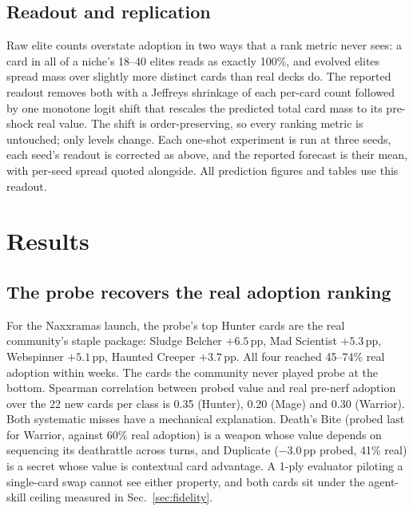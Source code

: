 \documentclass[conference]{IEEEtran}
\newcommand{\pp}{\,\text{pp}}
\begin{document}
\subsection{Readout and replication}
\label{sec:readout}
Raw elite counts overstate adoption in two ways that a rank metric
never sees: a card in all of a niche's 18--40 elites reads as
exactly 100\%, and evolved elites spread mass over slightly more
distinct cards than real decks do. The reported readout removes
both with a Jeffreys shrinkage of each per-card count followed by
one monotone logit shift that rescales the predicted total card
mass to its pre-shock real value. The shift is order-preserving, so
every ranking metric is untouched; only levels change. Each
one-shot experiment is run at three seeds, each seed's readout is
corrected as above, and the reported forecast is their mean, with
per-seed spread quoted alongside. All prediction figures and tables
use this readout.

\section{Results}
\label{sec:results}

\subsection{The probe recovers the real adoption ranking}
For the Naxxramas launch, the probe's top Hunter cards are the real
community's staple package: Sludge Belcher $+6.5\pp$, Mad Scientist
$+5.3\pp$, Webspinner $+5.1\pp$, Haunted Creeper $+3.7\pp$. All four
reached 45--74\% real adoption within weeks. The cards the community
never played probe at the bottom. Spearman correlation between
probed value and real pre-nerf adoption over the 22 new cards per
class is 0.35 (Hunter), 0.20 (Mage) and 0.30 (Warrior). Both
systematic misses have a mechanical explanation. Death's Bite
(probed last for Warrior, against 60\% real adoption) is a weapon
whose value depends on sequencing its deathrattle across turns, and
Duplicate ($-3.0\pp$ probed, 41\% real) is a secret whose value is
contextual card advantage. A 1-ply evaluator piloting a single-card
swap cannot see either property, and both cards sit under the
agent-skill ceiling measured in Sec.~\ref{sec:fidelity}.
\end{document}
